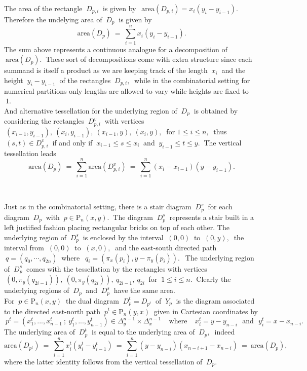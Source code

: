 \documentclass[10pt,leqeq]{article}
\begin{document}
The area of the rectangle $\ D_{p,i}\ $ is given by 
$\ \ \mathrm{area}(D_{p,i})=x_i(y_{i}-y_{i-1}). \ \ $
Therefore the undelying area of $\ D_p \ $ is given by
$$\mathrm{area}(D_{p})\ = \ \sum_{i=1}^{n}x_i(y_i-y_{i-1}).$$
The sum above represents a continuous analogue for a decomposition of $\ \mathrm{area}(D_{p}). \ $ These sort of decompositions come with extra structure since each summand is itself a product as we are keeping track of the length $\ x_i \ $ and the height $\ y_i-y_{i-1}\ $ of the rectangles $\ D_{p,i},\ $ while in the combinatorial setting for numerical partitions only lengths are allowed to vary while heights are fixed to $\ 1. \ $ \\

And alternative tessellation for the underlying region of $\ D_{p}\ $ is obtained by considering the rectangles $\ D^v_{p,i}\ $ with vertices $\ (x_{i-1},y_{i-1}), 
\ (x_i,y_{i-1}), \  (x_{i-1},y), \ (x_i,y),\ $ for $ 1\leq i \leq n, \ $ thus $\ (s,t)\in D^v_{p,i} \ $ if and only if $\ x_{i-1} \leq s \leq x_i \ $ and $\  y_{i-1} \leq t \leq y.\ $ The vertical tessellation leads 
$$\mathrm{area}(D_{p})\ = \  \sum_{i=1}^{n}\mathrm{area}(D^v_{p,i}) \ = \ \sum_{i=1}^{n}(x_i-x_{i-1})(y-y_{i-1}).$$ 

\

Just as in the combinatorial setting, there is a stair diagram
$\ D_p^s \ $ for each diagram $\ D_p \ $ with $\ p \in \mathrm{P}_n(x,y).\ $ The diagram $\ D_p^s \ $ represents a stair built in a left justified fashion placing rectangular bricks on top of each other. The underlying region of $\ D_p^s\ $ is enclosed by the interval $\ (0,0)\ $ to $\ (0,y),\ $ the interval from $\ (0,0)\ $ to  $\ (x,0),\ $ and the east-south directed path $ \ q= (q_0,\cdots, q_{2n})\ $ where $\ \ q_i=(\pi_x(p_i),y-\pi_y(p_i)). \ \ $ The underlying region of $\ D_p^s \ $ comes with the tessellation by the rectangles with vertices $\ (0,\pi_y(q_{2i-1})),  \ (0,\pi_y(q_{2i})), \ q_{2i-1}, \ q_{2i} \ $ for $\ 1 \leq i \leq n. \ $ Clearly the underlying regions of $\ D_p \ $ and  $\ D_p^s \ $  have the same area.\\


For $\ p \in \mathrm{P}_n(x,y)\ $ the dual diagram $\ D_p^t=D_{p^t} \ $ of  $\ Y_p \ $ is the diagram associated to the directed east-north path $\ p^t \in \mathrm{P}_n(y,x) \ $ given in Cartesian coordinates by 
$$\ p^t=(x_1^t,...,x_{n-1}^t\ ; \ y_1^t,...,y_{n-1}^t) \in 
\Delta^{n-1}_y \times \Delta^{n-1}_x \ \ \ \ \ \mbox{where} \ \ \ \ \ 
x_i^t=y-y_{n-i} \ \ \ \mbox{and} \ \ \  y_i^t=x-x_{n-i}.$$
The underlying area of $\  D_p^t \ $ is equal to the underlying area of $\ D_{p}, \ $ indeed
$$\mathrm{area}(D_{p^t}) \ = \ \sum_{i=1}^{n}x_i^t(y_i^t-y_{i-1}^t) \ = \
\sum_{i=1}^{n}(y-y_{n-i})(x_{n-i+1}-x_{n-i})\ = \ \mathrm{area}(D_{p}),$$
where the latter identity follows from the vertical tessellation of 
$\ D_{p}.  $ \\
\end{document}
